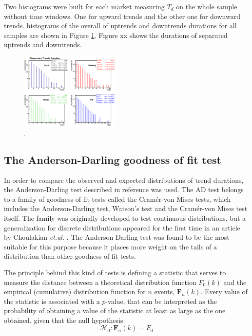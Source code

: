 \documentclass[a4paper]{jpconf}
\begin{document}
Two histograms were built for each market measuring $T_d$ on the whole sample without time windows. One for upward trends and the other one for downward trends. histograms  of the overall of uptrends and downtrends durations for all samples are shown in Figure \ref{fig:AllTrends}. Figure xx shows the durations of separated uptrends and downtrends.

\begin{figure}
\begin{center}
\includegraphics[width=0.45\textwidth]{img/AllTrends}
\end{center}
\caption{\small \label{fig:AllTrends}.}
\end{figure}



\subsection{The Anderson-Darling goodness of fit test}
In order to compare the observed and expected distributions of trend durations, the Anderson-Darling test described in reference \cite{Anderson} was used. The AD test belongs to a family of goodness of fit tests called the Cramér-von Mises tests, which includes the Anderson-Darling test, Watson's test and the Cramér-von Mises test itself. The family was originally developed to test continuous distributions, but a generalization for discrete distributions appeared for the first time in an article by Choulakian {\it et.al.} \cite{Choulakian}. The Anderson-Darling test was found to be the most suitable for this purpose because it places more weight on the tails of a distribution than other goodness of fit tests.

The principle behind this kind of tests is defining a statistic that serves to measure the distance between a theoretical distribution function $F_0(k)$ and the empirical (cumulative) distribution function for $n$ events, $\mathbf{F}_n(k)$. Every value of the statistic is associated with a $p$-value, that can be interpreted as the probability of obtaining a value of the statistic at least as large as the one obtained, given that the null hypothesis
\begin{equation}  \label{eq_null_hypothesis} 
\mathcal{H}_0: \mathbf{F}_n(k) = F_0 
\end{equation}
\end{document}
